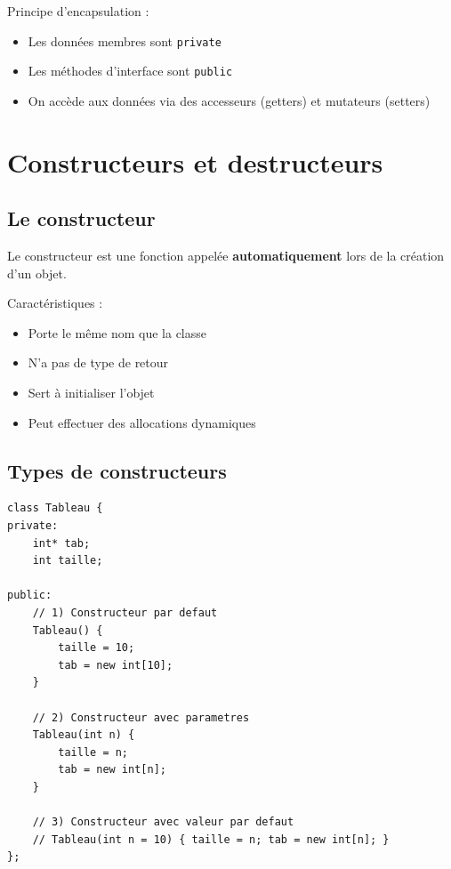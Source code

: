 \documentclass[12pt,a4paper]{article}
\begin{document}
\begin{regle}
Principe d'encapsulation :
\begin{itemize}
    \item Les données membres sont \texttt{private}
    \item Les méthodes d'interface sont \texttt{public}
    \item On accède aux données via des accesseurs (getters) et mutateurs (setters)
\end{itemize}
\end{regle}

\section{Constructeurs et destructeurs}

\subsection{Le constructeur}

Le constructeur est une fonction appelée \textbf{automatiquement} lors de la création d'un objet.

\begin{regle}
Caractéristiques :
\begin{itemize}
    \item Porte le même nom que la classe
    \item N'a pas de type de retour
    \item Sert à initialiser l'objet
    \item Peut effectuer des allocations dynamiques
\end{itemize}
\end{regle}

\subsection{Types de constructeurs}

\begin{lstlisting}[style=cpp, caption={Différents types de constructeurs}]
class Tableau {
private:
    int* tab;
    int taille;

public:
    // 1) Constructeur par defaut
    Tableau() {
        taille = 10;
        tab = new int[10];
    }

    // 2) Constructeur avec parametres
    Tableau(int n) {
        taille = n;
        tab = new int[n];
    }

    // 3) Constructeur avec valeur par defaut
    // Tableau(int n = 10) { taille = n; tab = new int[n]; }
};
\end{lstlisting}
\end{document}

